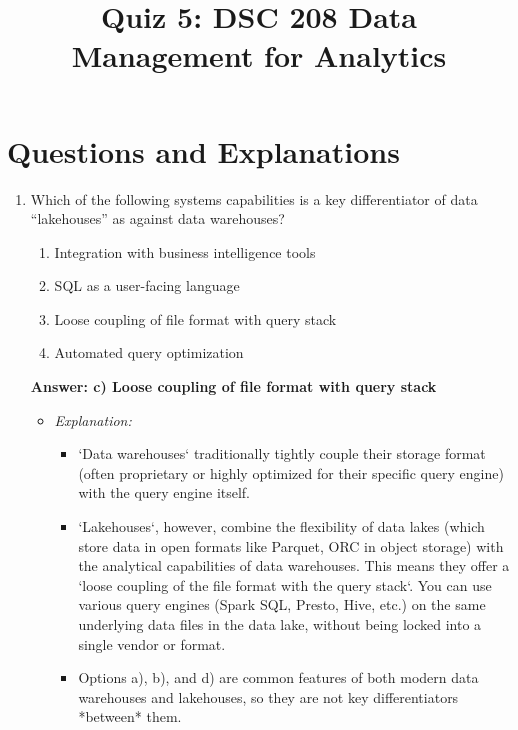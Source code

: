 \documentclass{article}
\title{Quiz 5: DSC 208 Data Management for Analytics}
\author{}
\date{}
\begin{document}
\maketitle

\section*{Questions and Explanations}

\begin{enumerate}[label=\textbf{Question \arabic*.}]

\item Which of the following systems capabilities is a key differentiator of data “lakehouses” as against data warehouses?
    \begin{enumerate}[label=\alph*)]
        \item Integration with business intelligence tools
        \item SQL as a user-facing language
        \item Loose coupling of file format with query stack
        \item Automated query optimization
    \end{enumerate}
    \textbf{Answer: c) Loose coupling of file format with query stack}
    \begin{itemize}
        \item \textit{Explanation:}
        \begin{itemize}
            \item `Data warehouses` traditionally tightly couple their storage format (often proprietary or highly optimized for their specific query engine) with the query engine itself.
            \item `Lakehouses`, however, combine the flexibility of data lakes (which store data in open formats like Parquet, ORC in object storage) with the analytical capabilities of data warehouses. This means they offer a `loose coupling of the file format with the query stack`. You can use various query engines (Spark SQL, Presto, Hive, etc.) on the same underlying data files in the data lake, without being locked into a single vendor or format.
            \item Options a), b), and d) are common features of both modern data warehouses and lakehouses, so they are not key differentiators *between* them.
        \end{itemize}
    \end{itemize}


\end{enumerate}
\end{document}
